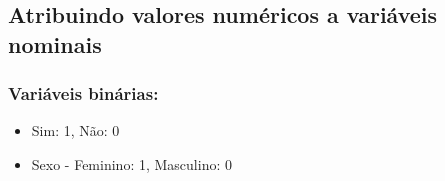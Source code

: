 \documentclass[11pt]{article}
\providecommand{\tightlist}{%
      \setlength{\itemsep}{0pt}\setlength{\parskip}{0pt}}
\begin{document}
\begin{tcolorbox}[breakable, size=fbox, boxrule=1pt, pad at break*=1mm,colback=cellbackground, colframe=cellborder]
\begin{Verbatim}[commandchars=\\\{\}]
\end{Verbatim}
\end{tcolorbox}

    \hypertarget{atribuindo-valores-numuxe9ricos-a-variuxe1veis-nominais}{%
\subsection{Atribuindo valores numéricos a variáveis
nominais}\label{atribuindo-valores-numuxe9ricos-a-variuxe1veis-nominais}}

\hypertarget{variuxe1veis-binuxe1rias}{%
\subsubsection{Variáveis binárias:}\label{variuxe1veis-binuxe1rias}}

\begin{itemize}
\tightlist
\item
  Sim: 1, Não: 0
\item
  Sexo - Feminino: 1, Masculino: 0
\end{itemize}
\end{document}
